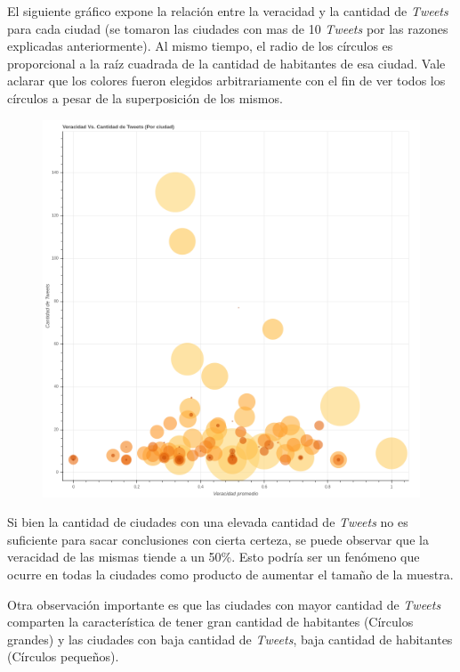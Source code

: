 \documentclass[titlepage,a4paper]{article}
\begin{document}
    El siguiente gráfico expone la relación entre la veracidad y la cantidad de \textit{Tweets} para cada ciudad (se tomaron las ciudades con mas de 10 \textit{Tweets} por las razones explicadas anteriormente). Al mismo tiempo, el radio de los círculos es proporcional a la raíz cuadrada de la cantidad de habitantes de esa ciudad. Vale aclarar que los colores fueron elegidos arbitrariamente con el fin de ver todos los círculos a pesar de la superposición de los mismos.
    
    \begin{figure}[H]
    \centering
    \includegraphics[width=1\textwidth]{graficos/Analisis de Locacion/veracidad_vs_antidad_de_tweets_por_ciudad.png}
    \caption{}
    \end{figure}
    
    Si bien la cantidad de ciudades con una elevada cantidad de \textit{Tweets} no es suficiente para sacar conclusiones con cierta certeza, se puede observar que la veracidad de las mismas tiende a un 50\%. Esto podría ser un fenómeno que ocurre en todas la ciudades como producto de aumentar el tamaño de la muestra.
    
    Otra observación importante es que las ciudades con mayor cantidad de \textit{Tweets} comparten la característica de tener gran cantidad de habitantes (Círculos grandes) y las ciudades con baja cantidad de \textit{Tweets}, baja cantidad de habitantes (Círculos pequeños).
    
\end{document}
